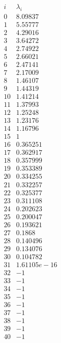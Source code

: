 \documentclass[12pt]{article}
\begin{document}
{$$
\begin{array}{|r|r|}
\hline
 i  & \lambda_i  \\
\hline
\hline
0 & 8.09837\\
\hline
1 & 5.55777\\
\hline
2 & 4.29016\\
\hline
3 & 3.64272\\
\hline
4 & 2.74922\\
\hline
5 & 2.66021\\
\hline
6 & 2.47141\\
\hline
7 & 2.17009\\
\hline
8 & 1.46107\\
\hline
9 & 1.44319\\
\hline
10 & 1.41214\\
\hline
11 & 1.37993\\
\hline
12 & 1.25248\\
\hline
13 & 1.23176\\
\hline
14 & 1.16796\\
\hline
15 & 1\\
\hline
16 & 0.365251\\
\hline
17 & 0.362917\\
\hline
18 & 0.357999\\
\hline
19 & 0.353389\\
\hline
20 & 0.334255\\
\hline
21 & 0.332257\\
\hline
22 & 0.325377\\
\hline
23 & 0.311108\\
\hline
24 & 0.202623\\
\hline
25 & 0.200047\\
\hline
26 & 0.193621\\
\hline
27 & 0.1868\\
\hline
28 & 0.140496\\
\hline
29 & 0.134076\\
\hline
30 & 0.104782\\
\hline
31 & 1.61105e-16\\
\hline
32 & -1\\
\hline
33 & -1\\
\hline
34 & -1\\
\hline
35 & -1\\
\hline
36 & -1\\
\hline
37 & -1\\
\hline
38 & -1\\
\hline
39 & -1\\
\hline
40 & -1\\

\end{array}$$}
\end{document}
